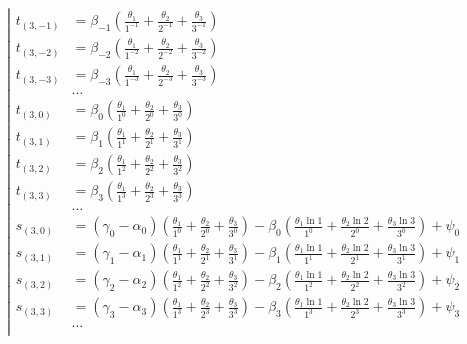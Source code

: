 \begin{equation*} \left| \begin{aligned}
t_{(3,-1)} &=
  \beta_{-1} \left(
  \frac{\theta_1}{1^{-1}}
+ \frac{\theta_2}{2^{-1}}
+ \frac{\theta_3}{3^{-1}} \right) \\
%
t_{(3,-2)} &=
  \beta_{-2} \left(
  \frac{\theta_1}{1^{-2}}
+ \frac{\theta_2}{2^{-2}}
+ \frac{\theta_3}{3^{-2}} \right) \\
%
t_{(3,-3)} &=
  \beta_{-3} \left(
  \frac{\theta_1}{1^{-3}}
+ \frac{\theta_2}{2^{-3}}
+ \frac{\theta_3}{3^{-3}} \right) \\
%
&\ldots \\
%
t_{(3,0)} &=
  \beta_0 \left(
  \frac{\theta_1}{1^0}
+ \frac{\theta_2}{2^0}
+ \frac{\theta_3}{3^0} \right) \\
%
t_{(3,1)} &=
  \beta_1 \left(
  \frac{\theta_1}{1^1}
+ \frac{\theta_2}{2^1}
+ \frac{\theta_3}{3^1} \right) \\
%
t_{(3,2)} &=
  \beta_2 \left(
  \frac{\theta_1}{1^2}
+ \frac{\theta_2}{2^2}
+ \frac{\theta_3}{3^2} \right) \\
%
t_{(3,3)} &=
  \beta_3 \left(
  \frac{\theta_1}{1^3}
+ \frac{\theta_2}{2^3}
+ \frac{\theta_3}{3^3} \right) \\
%
&\ldots \\
%
s_{(3,0)} &=
  (\gamma_0 - \alpha_0) \left(
  \frac{\theta_1}{1^0}
+ \frac{\theta_2}{2^0}
+ \frac{\theta_3}{3^0} \right)
- \beta_0 \left(
  \frac{\theta_1 \ln{1}}{1^0}
+ \frac{\theta_2 \ln{2}}{2^0}
+ \frac{\theta_3 \ln{3}}{3^0} \right)
+ \psi_0 \\
%
s_{(3,1)} &=
  (\gamma_1 - \alpha_1) \left(
  \frac{\theta_1}{1^1}
+ \frac{\theta_2}{2^1}
+ \frac{\theta_3}{3^1} \right)
- \beta_1 \left(
  \frac{\theta_1 \ln{1}}{1^1}
+ \frac{\theta_2 \ln{2}}{2^1}
+ \frac{\theta_3 \ln{3}}{3^1} \right)
+ \psi_1 \\
%
s_{(3,2)} &=
  (\gamma_2 - \alpha_2) \left(
  \frac{\theta_1}{1^2}
+ \frac{\theta_2}{2^2}
+ \frac{\theta_3}{3^2} \right)
- \beta_2 \left(
  \frac{\theta_1 \ln{1}}{1^2}
+ \frac{\theta_2 \ln{2}}{2^2}
+ \frac{\theta_3 \ln{3}}{3^2} \right)
+ \psi_2 \\
%
s_{(3,3)} &=
  (\gamma_3 - \alpha_3) \left(
  \frac{\theta_1}{1^3}
+ \frac{\theta_2}{2^3}
+ \frac{\theta_3}{3^3} \right)
- \beta_3 \left(
  \frac{\theta_1 \ln{1}}{1^3}
+ \frac{\theta_2 \ln{2}}{2^3}
+ \frac{\theta_3 \ln{3}}{3^3} \right)
+ \psi_3 \\
%
&\ldots \\
\end{aligned} \right. \end{equation*}

